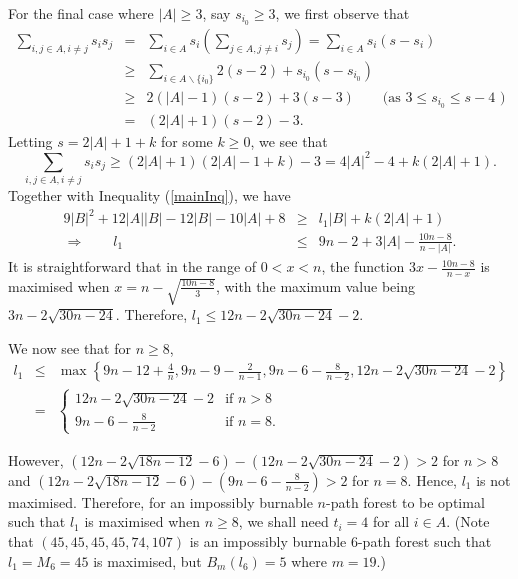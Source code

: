 \documentclass[
final
]{dmtcs-episciences}
\theoremstyle{definition}
\theoremstyle{remark}
\begin{document}
For the final case where $|A|\ge 3$, say $s_{i_0}\geq 3$, we first observe that
\begin{eqnarray*}
\sum_{i,j\in A, i \ne j} s_is_j &= & \sum_{i\in A}s_i\left(\sum_{j\in A, j\ne i} s_j\right)
= \sum_{i\in A} s_i (s-s_i)\\
&\ge &\sum_{i\in A\backslash \{i_0\}} 2(s-2)+ s_{i_0}(s-s_{i_0}) \\
&\ge & 2(|A|-1)(s-2)+ 3(s-3) \qquad\mbox{(as $3\le s_{i_0}\le s-4$ )}\\
&= &(2 |A|+1)(s-2)-3.
\end{eqnarray*}
Letting $s = 2|A| +1+ k$ for some $k\ge 0$, we see that
\begin{displaymath}
\sum_{i,j\in A, i \ne j} s_is_j\ge (2|A|+1)(2|A|-1 +k )-3 = 4|A|^2-4+k(2|A|+1).
\end{displaymath}
Together with Inequality (\ref{mainInq}), we have
\begin{eqnarray*}
9|B|^2 + 12|A||B| - 12|B| - 10|A| + 8 &\ge  & l_1|B| + k(2|A|+1)\\
\Longrightarrow\qquad l_1 &\le &  9n -2 +3|A| - \frac{10n-8}{n-|A|}.
\end{eqnarray*}
It is straightforward that in the range of $0<x<n$, the function $3x - \frac{10n-8}{n-x}$ is maximised when $x = n - \sqrt{\frac{10n-8}{3}}$, with the maximum value being $3n - 2\sqrt{30n-24}$.  Therefore, $l_1\le 12n - 2\sqrt{30n - 24} - 2$.

We now see that for $n\ge 8$,
\begin{eqnarray*}
l_1 &\le & \max \left\{9n-12+\frac{4}{n}, 9n-9-\frac{2}{n-1}, 9n-6-\frac{8}{n-2},  12n - 2\sqrt{30n - 24} - 2\right\}\\
&= & \begin{cases}
12n - 2\sqrt{30n - 24} - 2 &\text{if } n> 8\\
9n-6 - \frac{8}{n-2} &\text{if } n=8.
\end{cases}
\end{eqnarray*}

However, $(12n- 2\sqrt{18n - 12} - 6)-(  12n -2 \sqrt{30n-24} -2      )>2$  for $n>8$ and
$(12n- 2\sqrt{18n - 12} - 6)-( 9n-6 - \frac{8}{n-2}    )>2$ for $n=8$. Hence, $l_1$ is not maximised. Therefore, for an impossibly burnable $n$-path forest to be optimal such that $l_1$ is maximised when $n\geq 8$, we shall need $t_i=4$ for all $i\in A$. (Note that $(45,45,45,45,74,107)$ is an impossibly burnable $6$-path forest such that $l_1=M_6=45$ is maximised, but $B_m(l_6)=5$ where $m=19$.)
\end{document}
